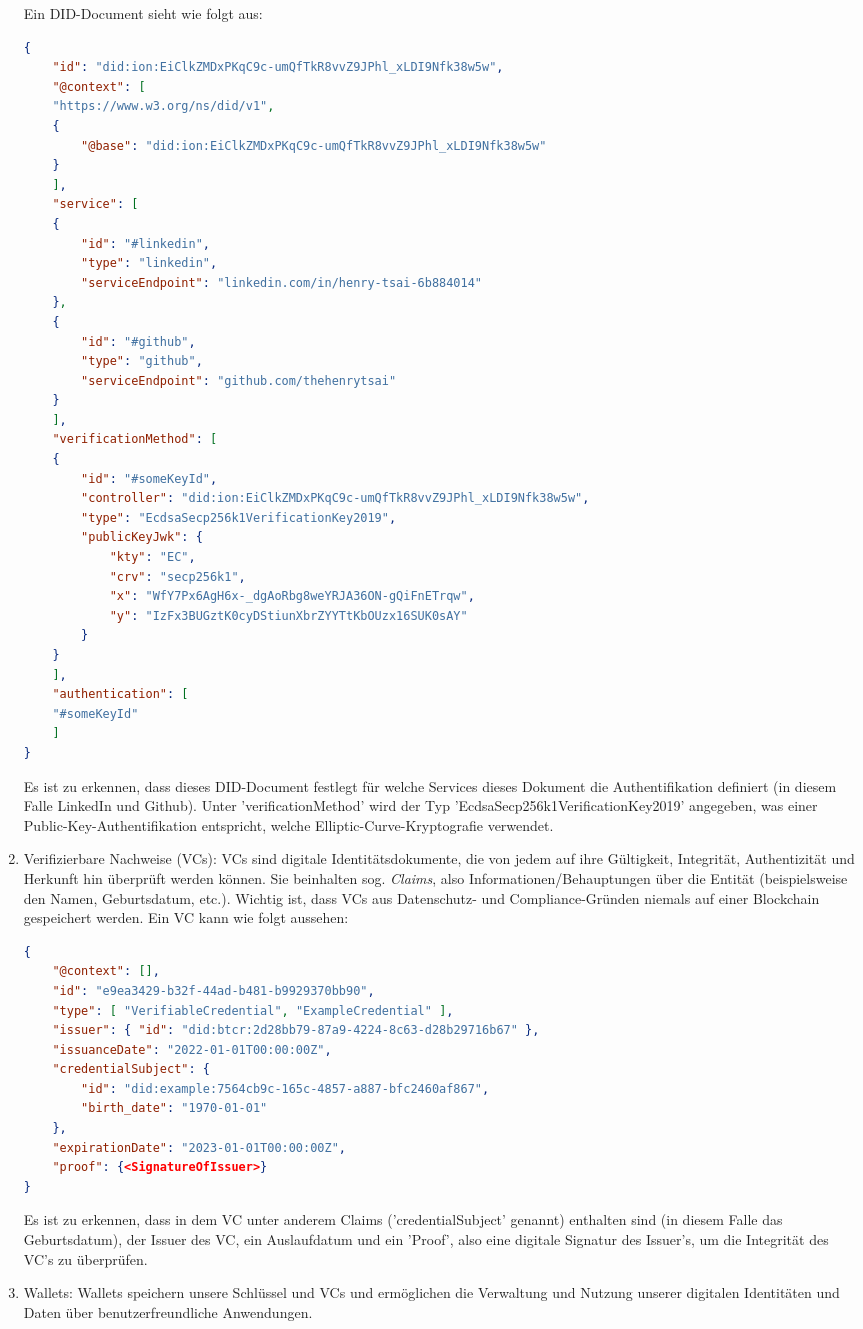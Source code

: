\begin{enumerate}
	Ein DID-Document sieht wie folgt aus:
	\begin{lstlisting}[language=json,firstnumber=1]	
{
	"id": "did:ion:EiClkZMDxPKqC9c-umQfTkR8vvZ9JPhl_xLDI9Nfk38w5w",
	"@context": [
	"https://www.w3.org/ns/did/v1",
	{
		"@base": "did:ion:EiClkZMDxPKqC9c-umQfTkR8vvZ9JPhl_xLDI9Nfk38w5w"
	}
	],
	"service": [
	{
		"id": "#linkedin",
		"type": "linkedin",
		"serviceEndpoint": "linkedin.com/in/henry-tsai-6b884014"
	},
	{
		"id": "#github",
		"type": "github",
		"serviceEndpoint": "github.com/thehenrytsai"
	}
	],
	"verificationMethod": [
	{
		"id": "#someKeyId",
		"controller": "did:ion:EiClkZMDxPKqC9c-umQfTkR8vvZ9JPhl_xLDI9Nfk38w5w",
		"type": "EcdsaSecp256k1VerificationKey2019",
		"publicKeyJwk": {
			"kty": "EC",
			"crv": "secp256k1",
			"x": "WfY7Px6AgH6x-_dgAoRbg8weYRJA36ON-gQiFnETrqw",
			"y": "IzFx3BUGztK0cyDStiunXbrZYYTtKbOUzx16SUK0sAY"
		}
	}
	],
	"authentication": [
	"#someKeyId"
	]
}
	\end{lstlisting}
	
	Es ist zu erkennen, dass dieses DID-Document festlegt für welche Services dieses Dokument die Authentifikation definiert (in diesem Falle LinkedIn und Github). Unter 'verificationMethod' wird der Typ 'EcdsaSecp256k1VerificationKey2019' angegeben, was einer Public-Key-Authentifikation entspricht, welche Elliptic-Curve-Kryptografie verwendet.
	
	\item Verifizierbare Nachweise (VCs): VCs sind digitale Identitätsdokumente, die von jedem auf ihre Gültigkeit, Integrität, Authentizität und Herkunft hin überprüft werden können. Sie beinhalten sog. \textsl{Claims}, also Informationen/Behauptungen über die Entität (beispielsweise den Namen, Geburtsdatum, etc.). Wichtig ist, dass VCs aus Datenschutz- und Compliance-Gründen niemals auf einer Blockchain gespeichert werden. Ein VC kann wie folgt aussehen:
	
	\begin{lstlisting}[language=json,firstnumber=1]
{
	"@context": [],
	"id": "e9ea3429-b32f-44ad-b481-b9929370bb90",
	"type": [ "VerifiableCredential", "ExampleCredential" ],
	"issuer": { "id": "did:btcr:2d28bb79-87a9-4224-8c63-d28b29716b67" },
	"issuanceDate": "2022-01-01T00:00:00Z",
	"credentialSubject": {
		"id": "did:example:7564cb9c-165c-4857-a887-bfc2460af867",
		"birth_date": "1970-01-01"
	},
	"expirationDate": "2023-01-01T00:00:00Z",
	"proof": {<SignatureOfIssuer>}
}
	\end{lstlisting}
	
	Es ist zu erkennen, dass in dem VC unter anderem Claims ('credentialSubject' genannt) enthalten sind (in diesem Falle das Geburtsdatum), der Issuer des VC, ein Auslaufdatum und ein 'Proof', also eine digitale Signatur des Issuer's, um die Integrität des VC's zu überprüfen.
	
	\item Wallets: Wallets speichern unsere Schlüssel und VCs und ermöglichen die Verwaltung und Nutzung unserer digitalen Identitäten und Daten über benutzerfreundliche Anwendungen.
\end{enumerate}

